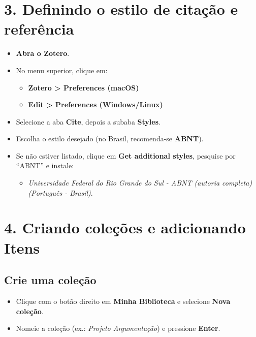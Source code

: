 \documentclass[
  letterpaper,
  DIV=11,
  numbers=noendperiod]{scrreprt}
\providecommand{\tightlist}{%
  \setlength{\itemsep}{0pt}\setlength{\parskip}{0pt}}
\begin{document}
\section{3. Definindo o estilo de citação e
referência}\label{definindo-o-estilo-de-citauxe7uxe3o-e-referuxeancia}

\begin{itemize}
\tightlist
\item
  \textbf{Abra o Zotero}.
\item
  No menu superior, clique em:

  \begin{itemize}
  \tightlist
  \item
    \textbf{Zotero \textgreater{} Preferences (macOS)}
  \item
    \textbf{Edit \textgreater{} Preferences (Windows/Linux)}
  \end{itemize}
\item
  Selecione a aba \textbf{Cite}, depois a subaba \textbf{Styles}.
\item
  Escolha o estilo desejado (no Brasil, recomenda-se \textbf{ABNT}).
\item
  Se não estiver listado, clique em \textbf{Get additional styles},
  pesquise por ``ABNT'' e instale:

  \begin{itemize}
  \tightlist
  \item
    \emph{Universidade Federal do Rio Grande do Sul - ABNT (autoria
    completa) (Português - Brasil)}.
  \end{itemize}
\end{itemize}

\section{4. Criando coleções e adicionando
Itens}\label{criando-coleuxe7uxf5es-e-adicionando-itens}

\subsection{Crie uma coleção}\label{crie-uma-coleuxe7uxe3o}

\begin{itemize}
\tightlist
\item
  Clique com o botão direito em \textbf{Minha Biblioteca} e selecione
  \textbf{Nova coleção}.
\item
  Nomeie a coleção (ex.: \emph{Projeto Argumentação}) e pressione
  \textbf{Enter}.
\end{itemize}
\end{document}
